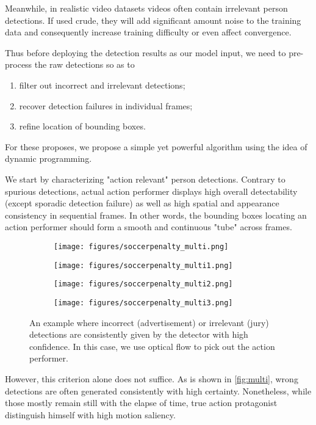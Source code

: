 Meanwhile, in realistic video datasets videos often contain irrelevant person detections. If used crude, they will add significant amount noise to the training data and consequently increase training difficulty or even affect convergence. 

Thus before deploying the detection results as our model input, we need to pre-process the raw detections so as to
\begin{enumerate}
\item filter out incorrect and irrelevant detections;
\item recover detection failures in individual frames;
\item refine location of bounding boxes.
\end{enumerate}

For these proposes, we propose a simple yet powerful algorithm using the idea of dynamic programming.

We start by characterizing "action relevant" person detections. Contrary to spurious detections, actual action performer displays high overall detectability (except sporadic detection failure) as well as high spatial and appearance consistency in sequential frames. 
In other words, the bounding boxes locating an action performer should form a smooth and continuous "tube" across frames.
\begin{figure}
\centering
\begin{subfigure}{0.25\textwidth}
\texttt{[image: figures/soccerpenalty\_multi.png]}
\end{subfigure}%
\begin{subfigure}{0.25\textwidth}
\texttt{[image: figures/soccerpenalty\_multi1.png]}
\end{subfigure}%
\begin{subfigure}{0.25\textwidth}
\texttt{[image: figures/soccerpenalty\_multi2.png]}
\end{subfigure}%
\begin{subfigure}{0.25\textwidth}
\texttt{[image: figures/soccerpenalty\_multi3.png]}
\end{subfigure}
\caption[Example of multiple person detections]{An example where incorrect (advertisement) or irrelevant (jury) detections are consistently given by the detector with high confidence. In this case, we use optical flow to pick out the action performer.}\label{fig:multi}
\end{figure}
However, this criterion alone does not suffice. As is shown in \autoref{fig:multi}, wrong detections are often generated consistently with high certainty. 
Nonetheless, while those mostly remain still with the elapse of time, true action protagonist distinguish himself with high motion saliency. 


